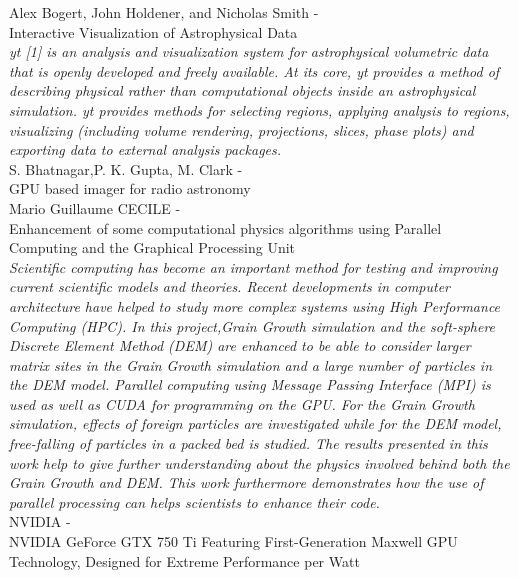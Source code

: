 \noindent
{\large Alex Bogert, John Holdener, and Nicholas Smith - \hfill \\ Interactive Visualization of Astrophysical Data }\\
\indent \textit{yt [1] is an analysis and visualization system for astrophysical volumetric data
that is openly developed and freely available. At its core, yt provides a method of
describing physical rather than computational objects inside an astrophysical
simulation. yt provides methods for selecting regions, applying analysis to regions,
visualizing (including volume rendering, projections, slices, phase plots) and
exporting data to external analysis packages.
}\\

\noindent
{\large S. Bhatnagar,P. K. Gupta, M. Clark - \hfill \\ GPU based imager for radio astronomy }\\

\noindent
{\large Mario Guillaume CECILE - \hfill \\ Enhancement of some computational physics algorithms using Parallel Computing and the Graphical Processing Unit}\\
\indent \textit{Scientific computing has become an important method for testing and improving current scientific models and theories. Recent developments in computer architecture have helped to study more complex systems using High Performance Computing (HPC). In this project,Grain Growth simulation and the soft-sphere Discrete Element Method (DEM) are enhanced to be able to consider larger matrix sites in the Grain Growth simulation and a large number of particles in the DEM model. Parallel computing using Message Passing Interface (MPI) is used as well as CUDA for programming on the GPU. For the Grain Growth simulation, effects of foreign particles are investigated while for the DEM model, free-falling of particles in a packed bed is studied. The results presented in this work help to give further understanding about the physics involved behind both the Grain Growth and DEM. This work furthermore demonstrates how the use of parallel processing can helps scientists to enhance their code.
}\\

\noindent
{\large NVIDIA - \hfill \\
NVIDIA GeForce GTX 750 Ti
Featuring First-Generation Maxwell GPU Technology, Designed for Extreme Performance per Watt}

